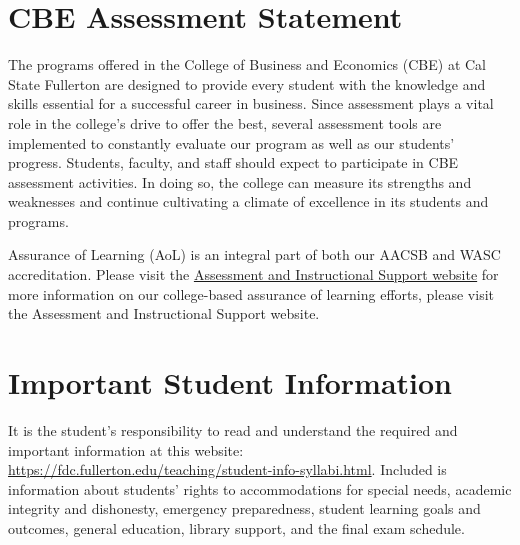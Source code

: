 \documentclass{./../Latex/syllabus}
\begin{document}
\section*{CBE Assessment Statement}
The programs offered in the College of Business and Economics (CBE) at Cal State Fullerton are designed to provide every student with the knowledge and skills essential for a successful career in business. Since assessment plays a vital role in the college's drive to offer the best, several assessment tools are implemented to constantly evaluate our program as well as our students' progress. Students, faculty, and staff should expect to participate in CBE assessment activities. In doing so, the college can measure its strengths and weaknesses and continue cultivating a climate of excellence in its students and programs.

Assurance of Learning (AoL) is an integral part of both our AACSB and WASC accreditation. Please visit the \href{https://business.fullerton.edu/assessment}{Assessment and Instructional Support website} for more information on our college-based assurance of learning efforts, please visit the Assessment and Instructional Support website.

\section*{Important Student Information}
It is the student's responsibility to read and understand the required and important information at this website: \href{https://fdc.fullerton.edu/teaching/student-info-syllabi.html}{https://fdc.fullerton.edu/teaching/student-info-syllabi.html}. Included is information about students' rights to accommodations for special needs, academic integrity and dishonesty, emergency preparedness, student learning goals and outcomes, general education, library support, and the final exam schedule.


\end{document}
